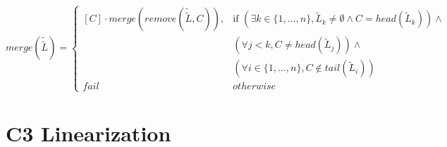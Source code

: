 \documentclass{article}
\begin{document}
\[
merge(\tilde{\tilde{L}}) =
\begin{cases}
[C] \cdot merge(remove(\tilde{\tilde{L}}, C)), & \text{if } (\exists k \in \{1, \ldots, n\}, \tilde{L}_k \neq \emptyset \land C = head(\tilde{L}_k)) \land \\
& (\forall j < k, C \neq head(\tilde{L}_j)) \land \\ 
& (\forall i \in \{1,\ldots,n\},C \notin tail(\tilde{L}_i)) \\ 

fail  & otherwise
\end{cases}
\]

\section*{C3 Linearization}
\end{document}
